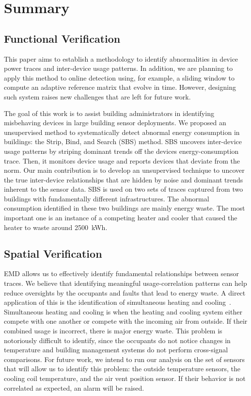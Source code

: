 \section{Summary}


\subsection{Functional Verification}

This paper aims to establish a methodology to identify abnormalities in device power traces and inter-device usage patterns.
In addition, we are planning to apply this method to online detection using, for example, a sliding window to compute an adaptive reference matrix that evolve in time.
However, designing such system raises new challenges that are left for future work.

The goal of this work is to assist building administrators in identifying misbehaving devices in large building sensor
deployments.  
We proposed an unsupervised method to systematically detect abnormal energy consumption in buildings: the Strip, Bind, and Search (SBS) method.
SBS uncovers inter-device usage patterns by striping dominant trends off the devices energy-consumption trace.
Then, it monitors device usage and reports devices that deviate from the norm.  
Our main contribution is to develop an unsupervised technique to uncover the true inter-device relationships that are hidden by noise and 
dominant trends inherent to the sensor data.  
SBS is used on two sets of traces captured from two buildings with fundamentally different infrastructures.
The abnormal consumption identified in these two buildings are mainly energy waste.
The most important one is an instance of a competing heater and cooler that caused the heater to waste around 2500~kWh.


\subsection{Spatial Verification}

EMD allows us to effectively identify fundamental relationships between sensor traces.
We believe that identifying meaningful usage-correlation patterns can help reduce oversights
by the occupants and faults that lead to energy waste.  A direct application of this is the identification
of simultaneous heating and cooling~\cite{simheatcool}.  Simultaneous heating and cooling is when the heating
and cooling system either compete with one another or compete with the incoming air from outside.  If
their combined usage is incorrect, there is major energy waste.
This problem is notoriously difficult to identify, since the occupants do not notice
changes in temperature and building management systems do not perform cross-signal comparisons.  For 
future work, we intend to run our analysis on the set of sensors that will
allow us to identify this problem: the outside temperature sensors, the cooling
coil temperature, and the air vent position sensor.  If their behavior
is not correlated as expected, an alarm will be raised.

